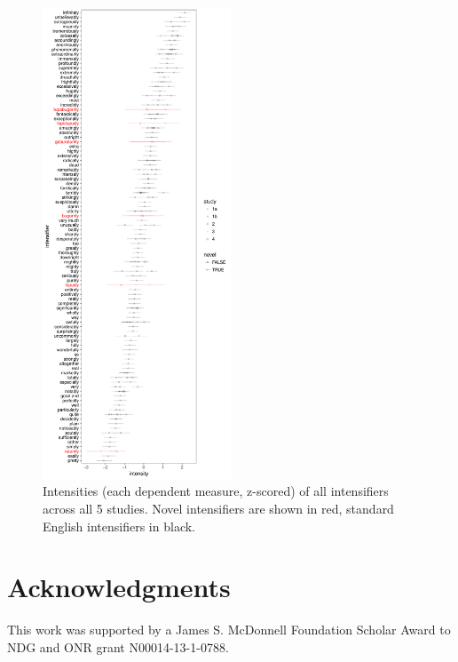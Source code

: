 \documentclass[10pt,letterpaper]{article}
\begin{document}
\begin{figure}[hbt]
\begin{center}
\includegraphics[width=0.5\textwidth]{images/intensities.pdf}
\end{center}
\caption{Intensities (each dependent measure, z-scored) of all intensifiers across all 5 studies. Novel intensifiers are shown in red, standard English intensifiers in black.}
\label{fig:intensities}
\end{figure}

\section{Acknowledgments}

This work was supported by a James S. McDonnell Foundation Scholar Award to NDG and ONR grant N00014-13-1-0788.



\setlength{\bibleftmargin}{.125in}
\setlength{\bibindent}{-\bibleftmargin}


\end{document}
